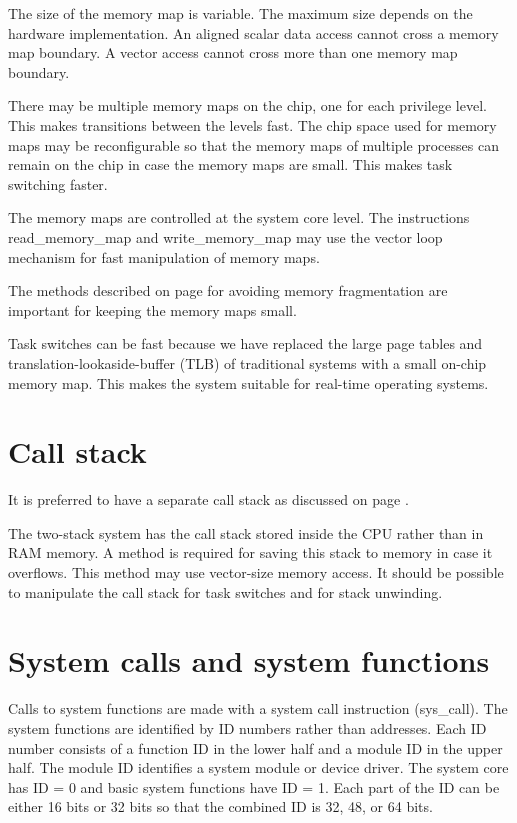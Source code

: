 \documentclass[forwardcom.tex]{subfiles}
\begin{document}
The size of the memory map is variable. The maximum size depends on the hardware implementation. 
An aligned scalar data access cannot cross a memory map boundary. A vector access cannot cross more than one memory map boundary.
\vv

There may be multiple memory maps on the chip, one for each privilege level. This makes transitions between the levels fast. The chip space used for memory maps may be reconfigurable so that the memory maps of multiple processes can remain on the chip in case the memory maps are small. This makes task switching faster.
\vv

The memory maps are controlled at the system core level. The instructions read\_memory\_map and write\_memory\_map may use the vector loop mechanism for fast manipulation of memory maps.
\vv

The methods described on page \pageref{memoryManagement} for avoiding memory fragmentation are important for keeping the memory maps small. 
\vv

Task switches can be fast because we have replaced the large page tables and translation-lookaside-buffer (TLB) of traditional systems with a small on-chip memory map. This makes the system suitable for real-time operating systems.

\section{Call stack}
It is preferred to have a separate call stack as discussed on page \pageref{callStackImplementation}. \vv

The two-stack system has the call stack stored inside the CPU rather than in RAM memory. A method is required for saving this stack to memory in case it overflows.  This method may use vector-size memory access. It should be possible to manipulate the call stack for task switches and for stack unwinding.

\section{System calls and system functions} \label{systemCallIDSystem}
Calls to system functions are made with a system call instruction (sys\_call). The system functions are identified by ID numbers rather than addresses. Each ID number consists of a function ID in the lower half and a module ID in the upper half. The module ID identifies a system module or device driver. The system core has ID = 0 and basic system functions have ID = 1. Each part of the ID can be either 16 bits or 32 bits so that the combined ID is 32, 48, or 64 bits. 
\vv
\end{document}

